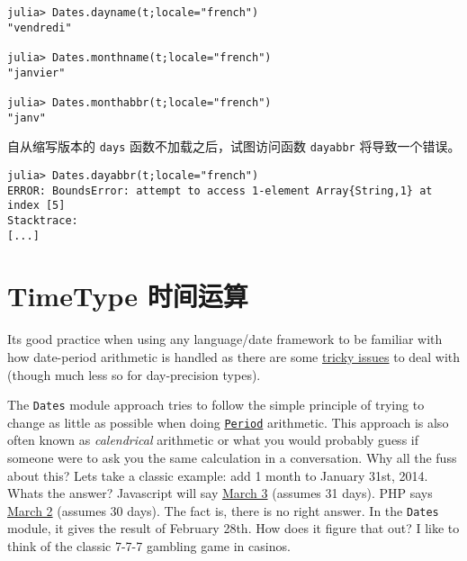 \begin{verbatim}
julia> Dates.dayname(t;locale="french")
"vendredi"

julia> Dates.monthname(t;locale="french")
"janvier"

julia> Dates.monthabbr(t;locale="french")
"janv"
\end{verbatim}



自从缩写版本的 \texttt{days} 函数不加载之后，试图访问函数 \texttt{dayabbr} 将导致一个错误。




\begin{verbatim}
julia> Dates.dayabbr(t;locale="french")
ERROR: BoundsError: attempt to access 1-element Array{String,1} at index [5]
Stacktrace:
[...]
\end{verbatim}



\hypertarget{552552737851946510}{}


\section{TimeType 时间运算}



It{\textquotesingle}s good practice when using any language/date framework to be familiar with how date-period arithmetic is handled as there are some \href{https://codeblog.jonskeet.uk/2010/12/01/the-joys-of-date-time-arithmetic/}{tricky issues} to deal with (though much less so for day-precision types).



The \texttt{Dates} module approach tries to follow the simple principle of trying to change as little as possible when doing \hyperlink{17624028548543163266}{\texttt{Period}} arithmetic. This approach is also often known as \emph{calendrical} arithmetic or what you would probably guess if someone were to ask you the same calculation in a conversation. Why all the fuss about this? Let{\textquotesingle}s take a classic example: add 1 month to January 31st, 2014. What{\textquotesingle}s the answer? Javascript will say \href{https://markhneedham.com/blog/2009/01/07/javascript-add-a-month-to-a-date/}{March 3} (assumes 31 days). PHP says \href{https://stackoverflow.com/questions/5760262/php-adding-months-to-a-date-while-not-exceeding-the-last-day-of-the-month}{March 2} (assumes 30 days). The fact is, there is no right answer. In the \texttt{Dates} module, it gives the result of February 28th. How does it figure that out? I like to think of the classic 7-7-7 gambling game in casinos.



